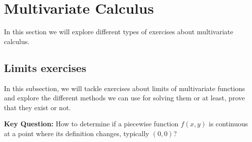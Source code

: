 \section{Multivariate Calculus}

In this section we will explore different types of exercises about multivariate calculus.

\subsection{Limits exercises}

In this subsection, we will tackle exercises about limits of multivariate functions and explore the different methods we can use for solving them or at least,
prove that they exist or not.

\begin{cascade}
	\textbf{Key Question:} How to determine if a piecewise function $f(x, y)$ is continuous at a point where its definition changes, typically $(0,0)$?


\end{cascade}
